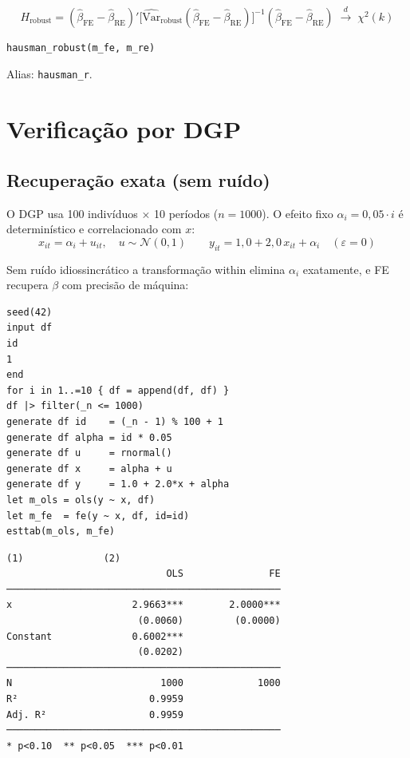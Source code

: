 \[
  H_{\mathrm{robust}} = (\hat\beta_{\mathrm{FE}} - \hat\beta_{\mathrm{RE}})'
      \bigl[\widehat{\mathrm{Var}}_{\mathrm{robust}}(\hat\beta_{\mathrm{FE}} -
             \hat\beta_{\mathrm{RE}})\bigr]^{-1}
      (\hat\beta_{\mathrm{FE}} - \hat\beta_{\mathrm{RE}})
  \;\xrightarrow{d}\; \chi^2(k)
\]

\begin{lstlisting}[caption={Teste de Hausman robusto}]
hausman_robust(m_fe, m_re)
\end{lstlisting}

Alias: \texttt{hausman\_r}.

\section{Verificação por DGP}

\subsection*{Recuperação exata (sem ruído)}

O DGP usa 100 indivíduos × 10 períodos ($n = 1000$). O efeito fixo
$\alpha_i = 0{,}05\cdot i$ é determinístico e correlacionado com $x$:
\[
  x_{it} = \alpha_i + u_{it},\quad u \sim \mathcal{N}(0,1)
  \qquad
  y_{it} = 1{,}0 + 2{,}0\,x_{it} + \alpha_i \quad(\varepsilon = 0)
\]

Sem ruído idiossincrático a transformação within elimina $\alpha_i$
exatamente, e FE recupera $\beta$ com precisão de máquina:

\begin{lstlisting}[caption={FE com efeito fixo correlacionado — sem ruído}]
seed(42)
input df
id
1
end
for i in 1..=10 { df = append(df, df) }
df |> filter(_n <= 1000)
generate df id    = (_n - 1) % 100 + 1
generate df alpha = id * 0.05
generate df u     = rnormal()
generate df x     = alpha + u
generate df y     = 1.0 + 2.0*x + alpha
let m_ols = ols(y ~ x, df)
let m_fe  = fe(y ~ x, df, id=id)
esttab(m_ols, m_fe)
\end{lstlisting}

\begin{lstlisting}[language={}, basicstyle=\ttfamily\small,
  frame=none, numbers=none, backgroundcolor=\color{codbg},
  xleftmargin=0pt, xrightmargin=0pt, breaklines=false]
                            (1)              (2)
                            OLS               FE
────────────────────────────────────────────────
x                     2.9663***        2.0000***
                       (0.0060)         (0.0000)
Constant              0.6002***
                       (0.0202)
────────────────────────────────────────────────
N                          1000             1000
R²                       0.9959
Adj. R²                  0.9959
────────────────────────────────────────────────
* p<0.10  ** p<0.05  *** p<0.01
\end{lstlisting}

